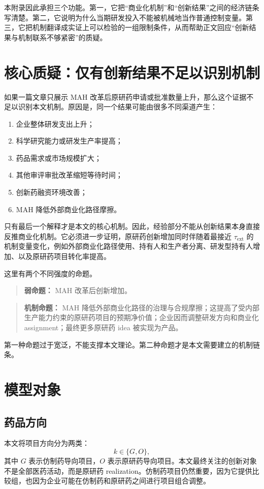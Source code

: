 \documentclass[12pt]{article}
\newcommand{\tauext}{\tau_{\mathrm{ext}}}
\begin{document}
本附录因此承担三个功能。第一，它把“商业化机制”和“创新结果”之间的经济链条写清楚。第二，它说明为什么当期研发投入不能被机械地当作普通控制变量。第三，它把机制翻译成实证上可以检验的一组限制条件，从而帮助正文回应“创新结果与机制联系不够紧密”的质疑。

\section{核心质疑：仅有创新结果不足以识别机制}

如果一篇文章只展示 MAH 改革后原研药申请或批准数量上升，那么这个证据不足以识别本文机制。原因是，同一个结果可能由很多不同渠道产生：
\begin{enumerate}
    \item 企业整体研发支出上升；
    \item 科学研究能力或研发生产率提高；
    \item 药品需求或市场规模扩大；
    \item 其他审评审批改革缩短等待时间；
    \item 创新药融资环境改善；
    \item MAH 降低外部商业化路径摩擦。
\end{enumerate}
只有最后一个解释才是本文的核心机制。因此，经验部分不能从创新结果本身直接反推商业化机制。它必须进一步证明，原研药创新增加同时伴随着最接近 $\tauext$ 的机制变量变化，例如外部商业化路径使用、持有人和生产者分离、研发型持有人增加、以及原研药项目转化率提高。

这里有两个不同强度的命题。
\begin{quote}
\textbf{弱命题：} MAH 改革后创新增加。
\end{quote}
\begin{quote}
\textbf{机制命题：} MAH 降低外部商业化路径的治理与合规摩擦；这提高了受内部生产能力约束的原研药项目的预期净价值；企业因而调整研发方向和商业化 assignment；最终更多原研药 idea 被实现为产品。
\end{quote}
第一种命题过于宽泛，不能支撑本文理论。第二种命题才是本文需要建立的机制链条。

\section{模型对象}

\subsection{药品方向}

本文将项目方向分为两类：
\[
k\in\{G,O\},
\]
其中 $G$ 表示仿制药导向项目，$O$ 表示原研药导向项目。本文最终关注的创新对象不是全部医药活动，而是原研药 realization。仿制药项目仍然重要，因为它提供比较组，也因为企业可能在仿制药和原研药之间进行项目组合调整。
\end{document}
